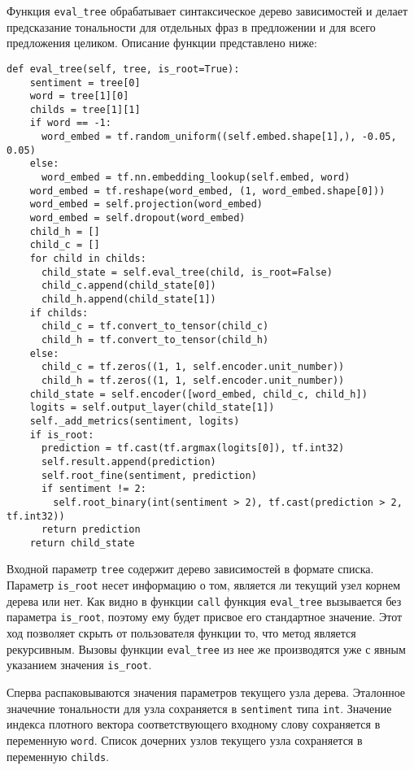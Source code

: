Функция \texttt{eval\_tree} обрабатывает синтаксическое дерево зависимостей и делает предсказание тональности для отдельных фраз в предложении и для всего предложения целиком. Описание функции представлено ниже:
\medskip
\begin{lstlisting}[style=Python]
  def eval_tree(self, tree, is_root=True):
    sentiment = tree[0]
    word = tree[1][0]
    childs = tree[1][1]
    if word == -1:
      word_embed = tf.random_uniform((self.embed.shape[1],), -0.05, 0.05)
    else:
      word_embed = tf.nn.embedding_lookup(self.embed, word)
    word_embed = tf.reshape(word_embed, (1, word_embed.shape[0]))
    word_embed = self.projection(word_embed)
    word_embed = self.dropout(word_embed)
    child_h = []
    child_c = []
    for child in childs:
      child_state = self.eval_tree(child, is_root=False)
      child_c.append(child_state[0])
      child_h.append(child_state[1])
    if childs:
      child_c = tf.convert_to_tensor(child_c)
      child_h = tf.convert_to_tensor(child_h)
    else:
      child_c = tf.zeros((1, 1, self.encoder.unit_number))
      child_h = tf.zeros((1, 1, self.encoder.unit_number))
    child_state = self.encoder([word_embed, child_c, child_h])
    logits = self.output_layer(child_state[1])
    self._add_metrics(sentiment, logits)
    if is_root:
      prediction = tf.cast(tf.argmax(logits[0]), tf.int32)
      self.result.append(prediction)
      self.root_fine(sentiment, prediction)
      if sentiment != 2:
        self.root_binary(int(sentiment > 2), tf.cast(prediction > 2, tf.int32))
      return prediction
    return child_state
\end{lstlisting}
\medskip

Входной параметр \texttt{tree} содержит дерево зависимостей в формате спи\-ска. Параметр \texttt{is\_root} несет информацию о том, является ли текущий узел корнем дерева или нет. Как видно в функции \texttt{call} функция \texttt{eval\_tree} вызывается без параметра \texttt{is\_root}, поэтому ему будет присвое его стандартное значение. Этот ход позволяет скрыть от пользователя функции то, что метод является рекурсивным. Вызовы функции \texttt{eval\_tree} из нее же производятся уже с явным указанием значения \texttt{is\_root}.

Сперва распаковываются значения параметров текущего узла дерева. Эталонное значечние тональности для узла сохраняется в \texttt{sentiment} типа \texttt{int}. Значение индекса плотного вектора соответствующего входному слову сохраняется в переменную \texttt{word}. Список дочерних узлов текущего узла сохраняется в переменную \texttt{childs}.

